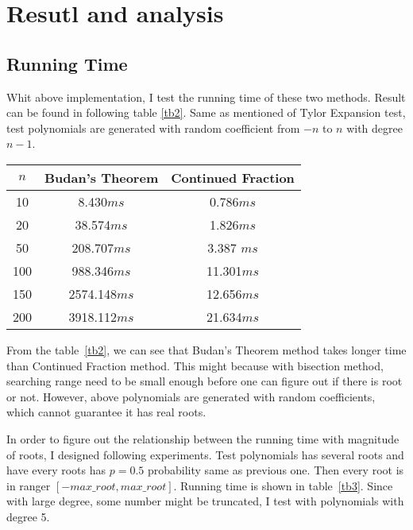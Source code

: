 \section{Resutl and analysis} \label{Analysis}

\subsection{Running Time}

Whit above implementation, I test the running time of these two methods. Result
can be found in following table \ref{tb2}. Same as mentioned of Tylor Expansion
test, test polynomials are generated with random coefficient from $-n$ to $n$ with
degree $n-1$. 

\begin{center}
\label{tb2}
\begin{tabular}{ |c|c|c| } 
 \hline

 $n$  & Budan's Theorem & Continued Fraction\\ 

 \hline
 10   & 8.430$ms$  & 0.786$ms$\\ 
 20   & 38.574$ms$  & 1.826$ms$\\ 
 50   & 208.707$ms$  & 3.387 $ms$\\ 
 100   & 988.346$ms$  & 11.301$ms$\\ 
 150   & 2574.148$ms$  & 12.656$ms$\\ 
 200   & 3918.112$ms$  & 21.634$ms$\\ 
 \hline
\end{tabular}
\end{center}

From the table~\ref{tb2}, we can see that Budan's Theorem method takes longer
time than Continued Fraction method. This might because with bisection method,
searching range need to be small enough before one can figure out if there is
root or not. However, above polynomials are generated with random coefficients,
which cannot guarantee it has real roots. 

In order to figure out the relationship between the running time with magnitude
of roots, I designed following experiments. Test polynomials has several roots
and have every roots has $p=0.5$ probability same as previous one. Then every
root is in ranger $[-max\_root, max\_root]$. Running time is shown in
table~\ref{tb3}. Since with large degree, some number might be truncated, I test
with polynomials with degree 5.

